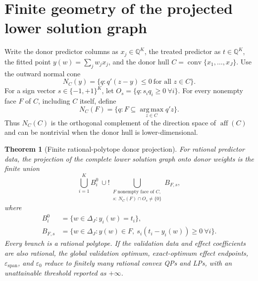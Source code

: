 \documentclass[10pt]{article}
\newtheorem{theorem}{Theorem}[section]
\theoremstyle{definition}
\newcommand{\Q}{\mathbb Q}
\newcommand{\DeltaJ}{\Delta_J}
\newcommand{\conv}{\operatorname{conv}}
\newcommand{\argmax}{\operatorname*{arg\,max}}
\newcommand{\eps}{\varepsilon}
\begin{document}
\section{Finite geometry of the projected lower solution graph}

Write the donor predictor columns as $x_j\in\Q^K$, the treated predictor as
$t\in\Q^K$, the fitted point $y(w)=\sum_jw_jx_j$, and the donor hull
$C=\conv\{x_1,\ldots,x_J\}$.  Use the outward normal cone
\[
 N_C(y)=\{q:q'(z-y)\le0\ \text{for all }z\in C\}.
\]
For a sign vector $s\in\{-1,+1\}^K$, let
$O_s=\{q:s_iq_i\ge0\ \forall i\}$.
For every nonempty face $F$ of $C$, including $C$ itself, define
\[
 N_C(F)=\{q:F\subseteq\argmax_{z\in C}q'z\}.
\]
Thus $N_C(C)$ is the orthogonal complement of the direction space of
$\operatorname{aff}(C)$ and can be nontrivial when the donor hull is
lower-dimensional.

\begin{theorem}[Finite rational-polytope donor projection]\label{thm:general}
For rational predictor data, the projection of the complete lower solution graph onto
donor weights is the finite union
\[
 \bigcup_{i=1}^K B_i^0\ \cup\!!
 \bigcup_{\substack{F\text{ nonempty face of }C,\\
                     s:\ N_C(F)\cap O_s\ne\{0\}}} B_{F,s},
\]
where
\begin{align*}
 B_i^0&=\{w\in\DeltaJ:y_i(w)=t_i\},\\
 B_{F,s}&=\{w\in\DeltaJ:y(w)\in F,\ s_i(t_i-y_i(w))\ge0\ \forall i\}.
\end{align*}
Every branch is a rational polytope.  If the validation data and effect
coefficients are also rational, the global validation optimum, exact-optimum
effect endpoints, $\eps_{\mathrm{span}}$, and $\eps_0$ reduce to finitely
many rational convex QPs and LPs, with an unattainable threshold reported as
$+\infty$.
\end{theorem}
\end{document}
